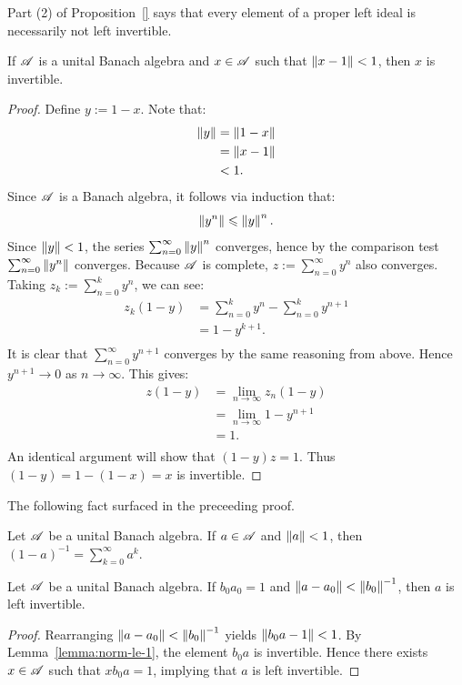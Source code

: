 Part (2) of Proposition~\ref{} says that every element of a proper left ideal is necessarily not left invertible.

\begin{lemma}\label{lemma:norm-le-1}
	If $\mathscr{A}$ is a unital Banach algebra and $x \in \mathscr{A}$ such that $\left\lVert x-1 \right\rVert < 1$, then $x$ is invertible.
\end{lemma}
	\begin{proof}
		Define $y:=1-x$. Note that:
		\begin{align*}
			\left\lVert y \right\rVert
			&= \left\lVert 1-x \right\rVert \\
			&= \left\lVert x-1 \right\rVert \\
			&< 1.
		\end{align*}
		Since $\mathscr{A}$ is a Banach algebra, it follows via induction that:
		\[
			\left\lVert y^n \right\rVert \leqslant \left\lVert y \right\rVert^n.
		\]
		Since $\left\lVert y \right\rVert < 1$, the series $\sum_{n=0}^{\infty} \left\lVert y \right\rVert^n$ converges, hence by the comparison test $\sum_{n=0}^{\infty} \left\lVert y^n \right\rVert$ converges. Because $\mathscr{A}$ is complete, $z:=\sum_{n=0}^{\infty}y^n$ also converges. Taking $z_k := \sum_{n=0}^{k}y^n$, we can see:
		\begin{align*}
			z_k(1-y)
			&= \sum_{n=0}^{k} y^n - \sum_{n=0}^{k} y^{n+1} \\
			&= 1-y^{k+1}. \\
		\end{align*}
		It is clear that $\sum_{n=0}^{\infty} y^{n+1}$ converges by the same reasoning from above. Hence $y^{n+1} \rightarrow 0$ as $n \rightarrow \infty$. This gives:
		\begin{align*}
			z(1-y)
			&= \lim_{n \rightarrow \infty}z_n(1-y) \\
			&= \lim_{n \rightarrow \infty}1-y^{n+1} \\
			&= 1. \\
		\end{align*}
		An identical argument will show that $(1-y)z = 1$. Thus $(1-y) = 1-(1-x) = x$ is invertible.
	\end{proof}

The following fact surfaced in the preceeding proof.

\begin{corollary}\label{cor:power-series-basic}
	Let $\mathscr{A}$ be a unital Banach algebra. If $a \in \mathscr{A}$ and $\left\lVert a \right\rVert < 1$, then $(1-a)^{-1} = \sum_{k=0}^{\infty} a^k$.
\end{corollary}

\begin{lemma}\label{lemma:inverse-pertubation}
	Let $\mathscr{A}$ be a unital Banach algebra. If $b_0 a_0 = 1$ and $\left\lVert a - a_0 \right\rVert < \left\lVert b_0 \right\rVert^{-1}$, then $a$ is left invertible. 
\end{lemma}	
	\begin{proof}
		Rearranging $\left\lVert a-a_0 \right\rVert < \left\lVert b_0 \right\rVert^{-1}$ yields $\left\lVert b_0 a - 1 \right\rVert < 1$. By Lemma~\ref{lemma:norm-le-1}, the element $b_0a$ is invertible. Hence there exists $x \in \mathscr{A}$ such that $xb_0a = 1$, implying that $a$ is left invertible.
	\end{proof}

